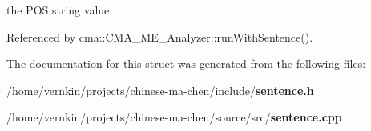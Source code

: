 the POS string value 

Referenced by cma::CMA\_\-ME\_\-Analyzer::runWithSentence().

The documentation for this struct was generated from the following files:\begin{CompactItemize}
\item 
/home/vernkin/projects/chinese-ma-chen/include/{\bf sentence.h}\item 
/home/vernkin/projects/chinese-ma-chen/source/src/{\bf sentence.cpp}\end{CompactItemize}
